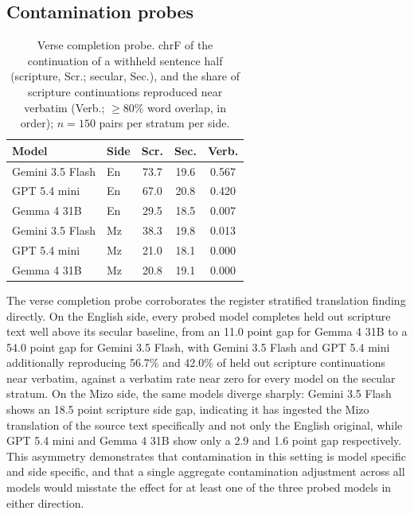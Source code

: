 \documentclass[pdflatex,sn-mathphys-ay]{sn-jnl}
\begin{document}
\subsection{Contamination probes}
\label{sec:probe-results}

\begin{table}[t]
\centering
\small
\begin{tabular}{llccc}
\toprule
\textbf{Model} & \textbf{Side} & \textbf{Scr.} & \textbf{Sec.} & \textbf{Verb.} \\
\midrule
Gemini 3.5 Flash & En & 73.7 & 19.6 & 0.567 \\
GPT 5.4 mini & En & 67.0 & 20.8 & 0.420 \\
Gemma 4 31B & En & 29.5 & 18.5 & 0.007 \\
Gemini 3.5 Flash & Mz & 38.3 & 19.8 & 0.013 \\
GPT 5.4 mini & Mz & 21.0 & 18.1 & 0.000 \\
Gemma 4 31B & Mz & 20.8 & 19.1 & 0.000 \\
\bottomrule
\end{tabular}
\caption{Verse completion probe. chrF of the continuation of a withheld sentence half (scripture, Scr.; secular, Sec.), and the share of scripture continuations reproduced near verbatim (Verb.; $\geq$80\% word overlap, in order); $n{=}150$ pairs per stratum per side.}
\label{tab:verse-probe}
\end{table}

The verse completion probe corroborates the register stratified translation finding directly. On the English side, every probed model completes held out scripture text well above its secular baseline, from an 11.0 point gap for Gemma 4 31B to a 54.0 point gap for Gemini 3.5 Flash, with Gemini 3.5 Flash and GPT 5.4 mini additionally reproducing 56.7\% and 42.0\% of held out scripture continuations near verbatim, against a verbatim rate near zero for every model on the secular stratum. On the Mizo side, the same models diverge sharply: Gemini 3.5 Flash shows an 18.5 point scripture side gap, indicating it has ingested the Mizo translation of the source text specifically and not only the English original, while GPT 5.4 mini and Gemma 4 31B show only a 2.9 and 1.6 point gap respectively. This asymmetry demonstrates that contamination in this setting is model specific and side specific, and that a single aggregate contamination adjustment across all models would misstate the effect for at least one of the three probed models in either direction.
\end{document}
